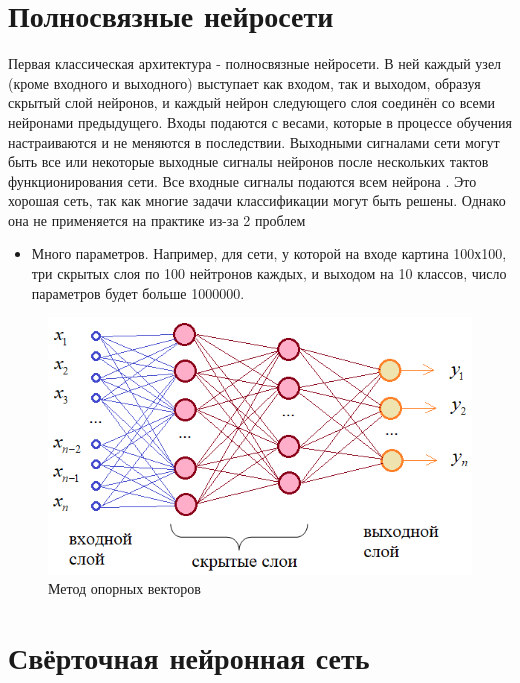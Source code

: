 \section {Полносвязные нейросети}

Первая классическая архитектура - полносвязные нейросети. В ней каждый узел (кроме входного и выходного) выступает как входом, так и выходом, образуя скрытый слой нейронов, и каждый нейрон следующего слоя соединён со всеми нейронами предыдущего. Входы подаются с весами, которые в процессе обучения настраиваются и не меняются в последствии. Выходными сигналами сети могут быть все или некоторые выходные сигналы нейронов после нескольких тактов функционирования сети. Все входные сигналы подаются всем нейрона \cite{neronnetwork9}. Это хорошая сеть, так как многие задачи классификации могут быть решены. Однако она не применяется на практике из-за 2 проблем
\begin{itemize}
	\item Много параметров. Например, для сети, у которой на входе картина 100х100, три скрытых слоя по 100 нейтронов каждых, и выходом на 10 классов, число параметров будет больше 1000000.
\end{itemize}

\captionsetup{justification=centering,singlelinecheck=off}
\begin{figure}[h!]
	\centering
		\includegraphics[pages=-, scale=0.9]{img/FNN.png}
		\caption{Метод опорных векторов}  
\end{figure}

\section {Свёрточная нейронная сеть}

